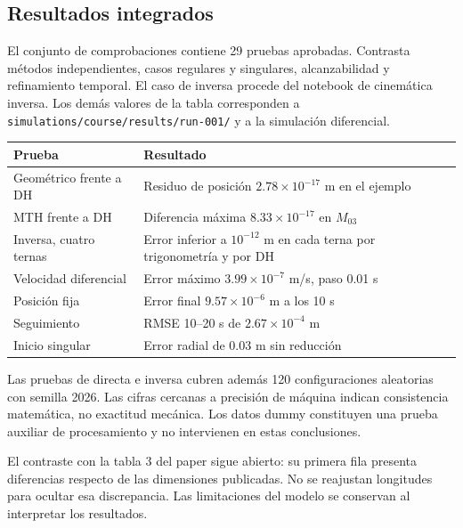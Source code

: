 \subsection{Resultados integrados}
El conjunto de comprobaciones contiene 29 pruebas aprobadas. Contrasta métodos independientes, casos regulares y singulares, alcanzabilidad y refinamiento temporal. El caso de inversa procede del notebook de cinemática inversa. Los demás valores de la tabla corresponden a \texttt{simulations/course/results/run-001/} y a la simulación diferencial.
\begin{center}\begin{tabularx}{\linewidth}{@{}lX@{}}\toprule
Prueba & Resultado\\\midrule
Geométrico frente a DH & Residuo de posición $2.78\times10^{-17}$ m en el ejemplo\\
MTH frente a DH & Diferencia máxima $8.33\times10^{-17}$ en $M_{03}$\\
Inversa, cuatro ternas & Error inferior a $10^{-12}$ m en cada terna por trigonometría y por DH\\
Velocidad diferencial & Error máximo $3.99\times10^{-7}$ m/s, paso 0.01 s\\
Posición fija & Error final $9.57\times10^{-6}$ m a los 10 s\\
Seguimiento & RMSE 10--20 s de $2.67\times10^{-4}$ m\\
Inicio singular & Error radial de 0.03 m sin reducción\\\bottomrule\end{tabularx}\end{center}
Las pruebas de directa e inversa cubren además 120 configuraciones aleatorias con semilla 2026. Las cifras cercanas a precisión de máquina indican consistencia matemática, no exactitud mecánica. Los datos dummy constituyen una prueba auxiliar de procesamiento y no intervienen en estas conclusiones.

El contraste con la tabla 3 del paper sigue abierto: su primera fila presenta diferencias respecto de las dimensiones publicadas. No se reajustan longitudes para ocultar esa discrepancia. Las limitaciones del modelo se conservan al interpretar los resultados.
